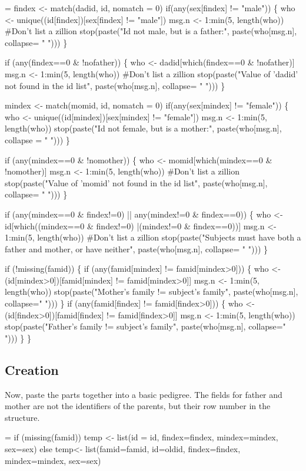 \documentclass{article}
\begin{document}
\begin{nwchunk}
=
 findex <- match(dadid, id, nomatch = 0)
 if(any(sex[findex] != "male")) \{
     who <- unique((id[findex])[sex[findex] != "male"])
     msg.n <- 1:min(5, length(who))  #Don't list a zillion
     stop(paste("Id not male, but is a father:", 
                paste(who[msg.n], collapse= " ")))
     \}
 
 if (any(findex==0 & !nofather)) \{
     who <- dadid[which(findex==0 & !nofather)]
     msg.n <- 1:min(5, length(who))  #Don't list a zillion
     stop(paste("Value of 'dadid' not found in the id list", 
                paste(who[msg.n], collapse= " ")))
     \}
     
 mindex <- match(momid, id, nomatch = 0)
 if(any(sex[mindex] != "female")) \{
     who <- unique((id[mindex])[sex[mindex] != "female"])
     msg.n <- 1:min(5, length(who))
     stop(paste("Id not female, but is a mother:", 
                paste(who[msg.n], collapse = " ")))
     \}
 
 if (any(mindex==0 & !nomother)) \{
     who <- momid[which(mindex==0 & !nomother)]
     msg.n <- 1:min(5, length(who))  #Don't list a zillion
     stop(paste("Value of 'momid' not found in the id list", 
                paste(who[msg.n], collapse= " ")))
     \}
 
 if (any(mindex==0 & findex!=0) || any(mindex!=0 & findex==0)) \{
     who <- id[which((mindex==0 & findex!=0) |(mindex!=0 & findex==0))] 
     msg.n <- 1:min(5, length(who))  #Don't list a zillion
     stop(paste("Subjects must have both a father and mother, or have neither",
                paste(who[msg.n], collapse= " ")))
 \}
 
 if (!missing(famid)) \{
     if (any(famid[mindex] != famid[mindex>0])) \{
         who <- (id[mindex>0])[famid[mindex] != famid[mindex>0]]
         msg.n <- 1:min(5, length(who))
         stop(paste("Mother's family != subject's family", 
                    paste(who[msg.n], collapse=" ")))
         \}
     if (any(famid[findex] != famid[findex>0])) \{
         who <- (id[findex>0])[famid[findex] != famid[findex>0]]
         msg.n <- 1:min(5, length(who))
         stop(paste("Father's family != subject's family", 
                    paste(who[msg.n], collapse=" ")))
         \}
     \}
\end{nwchunk}

\subsection{Creation}
Now, paste the parts together into a basic pedigree.
The fields for father and mother are not the identifiers of
the parents, but their row number in the structure.
\begin{nwchunk}
=
 if (missing(famid))
     temp <- list(id = id, findex=findex, mindex=mindex, sex=sex)
 else temp<- list(famid=famid, id=oldid, findex=findex, mindex=mindex, 
                  sex=sex)
\end{nwchunk}
\end{document}
